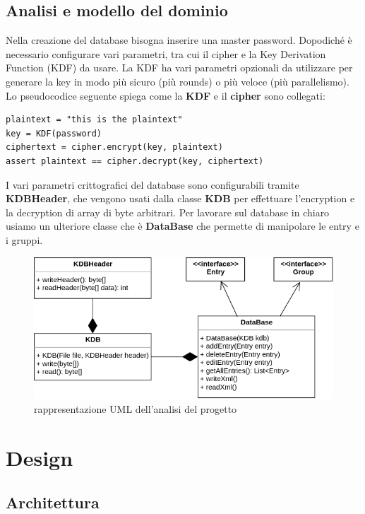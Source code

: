 \documentclass[a4paper,12pt]{report}
\begin{document}
\section{Analisi e modello del dominio}

Nella creazione del database bisogna inserire una master password. Dopodiché è 
necessario configurare vari parametri, tra cui il cipher e la Key Derivation Function (KDF)
da usare. La KDF ha vari parametri opzionali da utilizzare per generare la key
in modo più sicuro (più rounds) o più veloce (più parallelismo).
Lo pseudocodice seguente spiega come la \textbf{KDF} e il \textbf{cipher} sono collegati:
\begin{lstlisting}
plaintext = "this is the plaintext"
key = KDF(password)
ciphertext = cipher.encrypt(key, plaintext)
assert plaintext == cipher.decrypt(key, ciphertext)
\end{lstlisting}
I vari parametri crittografici del database sono configurabili tramite \textbf{KDBHeader},
che vengono usati dalla classe \textbf{KDB} per effettuare l'encryption e la decryption
di array di byte arbitrari.
Per lavorare sul database in chiaro usiamo un ulteriore classe che è \textbf{DataBase}
che permette di manipolare le entry e i gruppi.

\begin{figure}[h]
\centering{}
\includegraphics[width=\textwidth]{analysis}
\caption{rappresentazione UML dell'analisi del progetto}
\end{figure}

\chapter{Design}

\section{Architettura}
\end{document}
